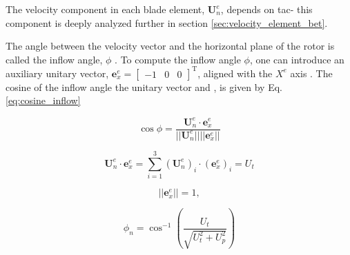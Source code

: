 The velocity component in each blade element, $\mathbf{U}_n^e$,  depends on   tac{- this component} is deeply analyzed further in section \ref{sec:velocity_element_bet}. 

The angle between the velocity vector and the horizontal plane of the rotor is called the inflow angle, $\phi$ . To compute the inflow angle $\phi$, one can introduce an auxiliary unitary vector, $\mathbf{e}_x^e = \begin{bmatrix} -1 & 0 & 0 \end{bmatrix}^\mathrm{T}$, aligned with the $X^e$ axis . The cosine of the inflow angle  the unitary vector and , is given by Eq. \ref{eq:cosine_inflow}

\begin{equation}
    \cos \phi = \frac{\mathbf{U}_n^e \cdot \mathbf{e}^e_x}{||\mathbf{U}_n^e|| ||\mathbf{e}_x^e||}
    \label{eq:cosine_inflow}
\end{equation}


\begin{equation}
    \mathbf{U}_n^e \cdot \mathbf{e}^e_x = \sum_ {i=1}^3 (\mathbf{U}_n^e)_i \cdot (\mathbf{e}_x^e)_i = U_t
\end{equation}

\noindent {}

\begin{equation}
    || \mathbf{e}^e_x || =  1,
    \label{eq:unitary_vec_norm}
\end{equation}

\noindent {}

\begin{equation}
    \phi_n = \cos^{-1} \left( \frac{U_t}{\sqrt{U_t^2 + U_p^2}}\right)
    \label{eq:final_eq_inflow}
\end{equation}

